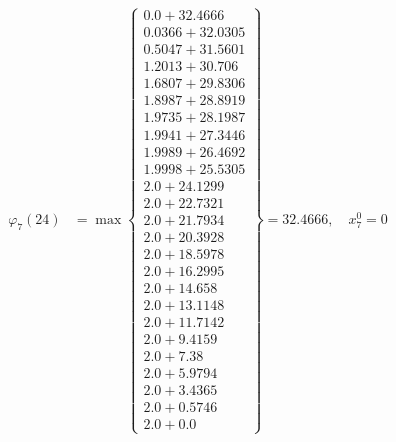 \documentclass{article}
\begin{document}
\begin{align*}
\varphi_{7}(24) &= \max \left\{ \begin{array}{c}
0.0 + 32.4666 \\
 0.0366 + 32.0305 \\
 0.5047 + 31.5601 \\
 1.2013 + 30.706 \\
 1.6807 + 29.8306 \\
 1.8987 + 28.8919 \\
 1.9735 + 28.1987 \\
 1.9941 + 27.3446 \\
 1.9989 + 26.4692 \\
 1.9998 + 25.5305 \\
 2.0 + 24.1299 \\
 2.0 + 22.7321 \\
 2.0 + 21.7934 \\
 2.0 + 20.3928 \\
 2.0 + 18.5978 \\
 2.0 + 16.2995 \\
 2.0 + 14.658 \\
 2.0 + 13.1148 \\
 2.0 + 11.7142 \\
 2.0 + 9.4159 \\
 2.0 + 7.38 \\
 2.0 + 5.9794 \\
 2.0 + 3.4365 \\
 2.0 + 0.5746 \\
 2.0 + 0.0
\end{array} \right\}=32.4666, \quad x_{7}^0=0\\
  

\end{align*}
\end{document}
